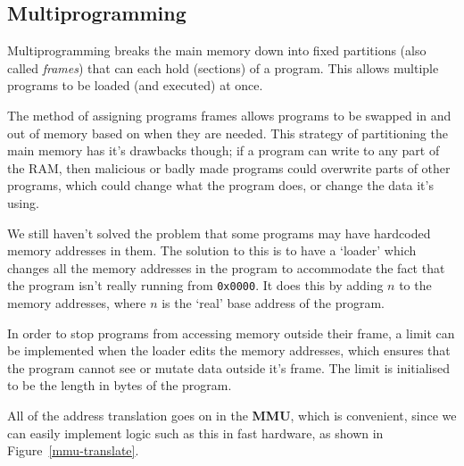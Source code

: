\subsection{Multiprogramming}

Multiprogramming breaks the main memory down into fixed partitions (also called
\textit{frames}) that can each hold (sections) of a program. This allows
multiple programs to be loaded (and executed) at once.

\begin{center}
	\begin{drawstack}
			         
		     
		     
		     
	\end{drawstack}
\end{center}

The method of assigning programs frames allows programs to be swapped in and out
of memory based on when they are needed. This strategy of partitioning the main
memory has it's drawbacks though; if a program can write to any part of the RAM,
then malicious or badly made programs could overwrite parts of other programs,
which could change what the program does, or change the data it's using.

We still haven't solved the problem that some programs may have hardcoded memory
addresses in them. The solution to this is to have a `loader' which changes all
the memory addresses in the program to accommodate the fact that the program
isn't really running from \texttt{0x0000}. It does this by adding $n$ to the
memory addresses, where $n$ is the `real' base address of the program.


In order to stop programs from accessing memory outside their frame, a limit can
be implemented when the loader edits the memory addresses, which ensures that
the program cannot see or mutate data outside it's frame. The limit is
initialised to be the length in bytes of the program.


All of the address translation goes on in the \textbf{MMU}, which is convenient,
since we can easily implement logic such as this in fast hardware, as shown in
Figure~\ref{mmu-translate}.

